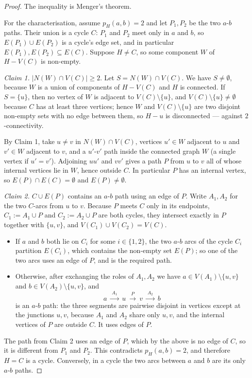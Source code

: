 \documentclass[11pt,a4paper]{article}
\theoremstyle{definition}
\begin{document}
\begin{proof}
The inequality is Menger's theorem.

For the characterisation, assume $p_H(a,b)=2$ and let $P_1,P_2$ be the two
$a$-$b$ paths.  Their union is a cycle $C$: $P_1$ and $P_2$ meet only in $a$ and
$b$, so $E(P_1)\cup E(P_2)$ is a cycle's edge set, and in particular
$E(P_1),E(P_2)\subseteq E(C)$.  Suppose $H\ne C$, so some component $W$ of
$H-V(C)$ is non-empty.

\emph{Claim 1.} $|N(W)\cap V(C)|\ge 2$.  Let $S=N(W)\cap V(C)$.  We have
$S\ne\emptyset$, because $W$ is a union of components of $H-V(C)$ and $H$ is
connected.  If $S=\{u\}$, then no vertex of $W$ is adjacent to
$V(C)\setminus\{u\}$, and $V(C)\setminus\{u\}\ne\emptyset$ because $C$ has at
least three vertices; hence $W$ and $V(C)\setminus\{u\}$ are two disjoint
non-empty sets with no edge between them, so $H-u$ is disconnected --- against
$2$-connectivity.

By Claim 1, take $u\ne v$ in $N(W)\cap V(C)$, vertices $u'\in W$ adjacent to
$u$ and $v'\in W$ adjacent to $v$, and a $u'$-$v'$ path inside the connected
graph $W$ (a single vertex if $u'=v'$).  Adjoining $uu'$ and $vv'$ gives a path
$P$ from $u$ to $v$ all of whose internal vertices lie in $W$, hence outside $C$.
In particular $P$ has an internal vertex, so $E(P)\cap E(C)=\emptyset$ and
$E(P)\ne\emptyset$.

\emph{Claim 2.} $C\cup E(P)$ contains an $a$-$b$ path using an edge of $P$.
Write $A_1,A_2$ for the two $C$-arcs from $u$ to $v$.  Because $P$ meets $C$
only in its endpoints, $C_1:=A_1\cup P$ and $C_2:=A_2\cup P$ are both cycles,
they intersect exactly in $P$ together with $\{u,v\}$, and
$V(C_1)\cup V(C_2)=V(C)$.
\begin{itemize}[leftmargin=1.4em,nosep]
\item If $a$ and $b$ both lie on $C_i$ for some $i\in\{1,2\}$, the two $a$-$b$
  arcs of the cycle $C_i$ partition $E(C_i)$, which contains the non-empty set
  $E(P)$; so one of the two arcs uses an edge of $P$, and is the required path.
\item Otherwise, after exchanging the roles of $A_1,A_2$ we have
  $a\in V(A_1)\setminus\{u,v\}$ and $b\in V(A_2)\setminus\{u,v\}$, and
  \[
    a\ \xrightarrow{\;A_1\;}\ u\ \xrightarrow{\;P\;}\ v\ \xrightarrow{\;A_2\;}\ b
  \]
  is an $a$-$b$ path: the three segments are pairwise disjoint in vertices
  except at the junctions $u,v$, because $A_1$ and $A_2$ share only $u,v$, and
  the internal vertices of $P$ are outside $C$.  It uses edges of $P$.
\end{itemize}

The path from Claim 2 uses an edge of $P$, which by the above is no edge of
$C$, so it is different from $P_1$ and $P_2$.  This contradicts
$p_H(a,b)=2$, and therefore $H=C$ is a cycle.  Conversely, in a cycle the two
arcs between $a$ and $b$ are its only $a$-$b$ paths.
\end{proof}
\end{document}
